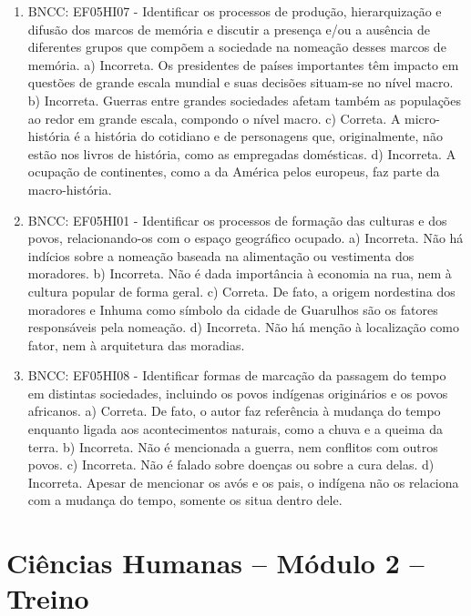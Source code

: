 \begin{enumerate}
\item
BNCC: EF05HI07 - Identificar os processos de produção,
hierarquização e difusão dos marcos de memória e discutir a presença
e/ou a ausência de diferentes grupos que compõem a sociedade na nomeação
desses marcos de memória.
a) Incorreta. Os presidentes de países importantes têm impacto em
questões de grande escala mundial e suas decisões situam-se no nível
macro.
b) Incorreta. Guerras entre grandes sociedades afetam também as
populações ao redor em grande escala, compondo o nível macro.
c) Correta. A micro-história é a história do cotidiano e de personagens
que, originalmente, não estão nos livros de história, como as empregadas
domésticas.
d) Incorreta. A ocupação de continentes, como a da América pelos
europeus, faz parte da macro-história.

\item
BNCC: EF05HI01 - Identificar os processos de formação das culturas e dos povos, relacionando-os com o espaço geográfico ocupado.
a) Incorreta. Não há indícios sobre a nomeação baseada na alimentação ou vestimenta dos moradores.
b) Incorreta. Não é dada importância à economia na rua, nem à cultura popular de forma geral.
c) Correta. De fato, a origem nordestina dos moradores e Inhuma como símbolo da cidade de Guarulhos são os fatores responsáveis pela
nomeação.
d) Incorreta. Não há menção à localização como fator, nem à arquitetura
das moradias.

\item
BNCC: EF05HI08 - Identificar formas de marcação da passagem do
tempo em distintas sociedades, incluindo os povos indígenas originários
e os povos africanos.
a) Correta. De fato, o autor faz referência à mudança do tempo enquanto
ligada aos acontecimentos naturais, como a chuva e a queima da terra.
b) Incorreta. Não é mencionada a guerra, nem conflitos com outros
povos.
c) Incorreta. Não é falado sobre doenças ou sobre a cura delas.
d) Incorreta. Apesar de mencionar os avós e os pais, o indígena não os
relaciona com a mudança do tempo, somente os situa dentro dele.
\end{enumerate}

\section*{Ciências Humanas – Módulo 2 – Treino}

